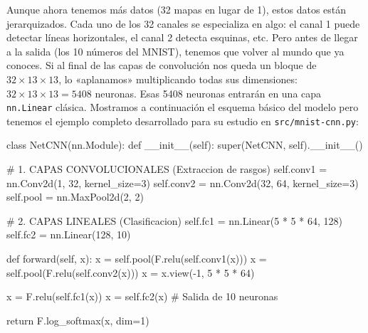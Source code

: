 \documentclass[a4paper,11pt]{article}
\begin{document}
Aunque ahora tenemos más datos (32 mapas en lugar de 1), estos datos
están jerarquizados. Cada uno de los 32 canales se especializa en algo:
el canal 1 puede detectar líneas horizontales, el canal 2 detecta
esquinas, etc. Pero antes de llegar a la salida (los 10 números del MNIST), tenemos que
volver al mundo que ya conoces. Si al final de las capas de convolución
nos queda un bloque de \(32 \times 13 \times 13\), lo «aplanamos»
multiplicando todas sus dimensiones: \(32 \times 13 \times 13=5408\)
neuronas. Esas 5408 neuronas entrarán en una capa \texttt{nn.Linear}
clásica. Mostramos a continuación el esquema básico del modelo pero tenemos el
ejemplo completo desarrollado para su estudio en \texttt{src/mnist-cnn.py}:


\begin{codigo}
class NetCNN(nn.Module):
    def __init__(self):
        super(NetCNN, self).__init__()
        
        # 1. CAPAS CONVOLUCIONALES (Extraccion de rasgos)
        self.conv1 = nn.Conv2d(1, 32, kernel_size=3) 
        self.conv2 = nn.Conv2d(32, 64, kernel_size=3)
        self.pool = nn.MaxPool2d(2, 2)
        
        # 2. CAPAS LINEALES (Clasificacion)
        self.fc1 = nn.Linear(5 * 5 * 64, 128)
        self.fc2 = nn.Linear(128, 10)

    def forward(self, x):
        x = self.pool(F.relu(self.conv1(x)))
        x = self.pool(F.relu(self.conv2(x)))
        x = x.view(-1, 5 * 5 * 64) 
        
        x = F.relu(self.fc1(x))
        x = self.fc2(x) # Salida de 10 neuronas
        
        return F.log_softmax(x, dim=1)
\end{codigo}
\end{document}
